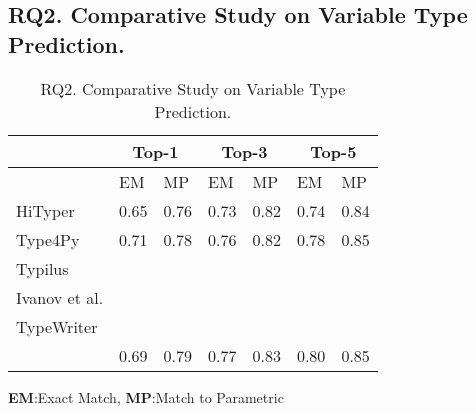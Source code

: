 \subsection{{\bf RQ2. Comparative Study on Variable Type Prediction.}}
\label{empirical-rq2}

\begin{table}[t]
	\caption{RQ2. Comparative Study on Variable Type Prediction.}
	\begin{center}
		\small
		\renewcommand{\arraystretch}{1} \begin{tabular}{p{1.7cm}<{\centering}|p{0.65cm}<{\centering}|p{0.65cm}<{\centering}|p{0.65cm}<{\centering}|p{0.65cm}<{\centering}|p{0.65cm}<{\centering}|p{0.65cm}<{\centering}}
			
			\hline
                       & \multicolumn{2}{c}{Top-1}         & \multicolumn{2}{c}{Top-3}         & \multicolumn{2}{c}{Top-5} \\
			\hline
                       & EM & MP & EM & MP & EM & MP  \\ 
			\hline
			HiTyper                                & 0.65 & 0.76 & 0.73 & 0.82 & 0.74 & 0.84 \\
			Type4Py                                & 0.71 & 0.78 & 0.76 & 0.82 & 0.78 & 0.85 \\
			Typilus                                &      &      &      &      &      &      \\
			Ivanov et al.\cite{ivanov21predicting} &      &      &      &      &      &      \\
			TypeWriter                             &      &      &      &      &      &      \\
			\hline
			{\tool}                                & 0.69 & 0.79 & 0.77 & 0.83 & 0.80 & 0.85 \\
			\hline
		\end{tabular}
		\label{RQ2-result}
		{\bf EM}:Exact Match, {\bf MP}:Match to Parametric
	\end{center}
\end{table}

